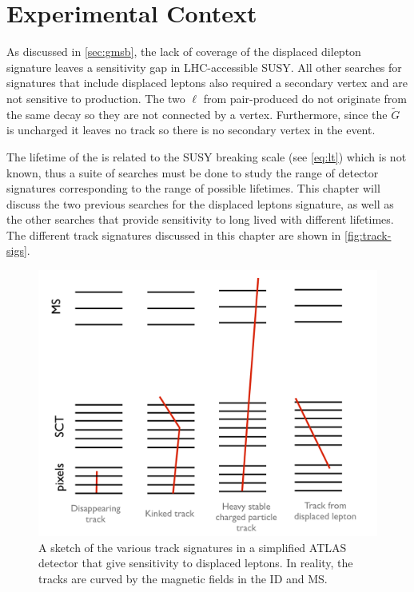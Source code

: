 \chapter{Experimental Context}
\label{chap:context}

As discussed in \autoref{sec:gmsb}, the lack of coverage of the displaced dilepton signature leaves a sensitivity gap in \ac{LHC}-accessible \ac{SUSY}. All other searches for signatures that include displaced leptons also required a secondary vertex and are not sensitive to \slep production. The two $\ell$ from pair-produced \slep do not originate from the same decay so they are not connected by a vertex. Furthermore, since the $\tilde{G}$ is uncharged it leaves no track so there is no secondary vertex in the event.

The lifetime of the \slep is related to the \ac{SUSY} breaking scale (see \autoref{eq:lt}) which is not known, thus a suite of searches must be done to study the range of detector signatures corresponding to the range of possible lifetimes. This chapter will discuss the two previous searches for the displaced leptons signature, as well as the other searches that provide sensitivity to long lived \slep with different lifetimes. The different track signatures discussed in this chapter are shown in \autoref{fig:track-sigs}.

\begin{figure}[!h]
\centering
\includegraphics[width=.7\textwidth]{figures/theory/track-signatures.png}
\caption{A sketch of the various track signatures in a simplified \ac{ATLAS} detector that give sensitivity to displaced leptons. In reality, the tracks are curved by the magnetic fields in the \ac{ID} and \ac{MS}.}
\label{fig:track-sigs}
\end{figure}



